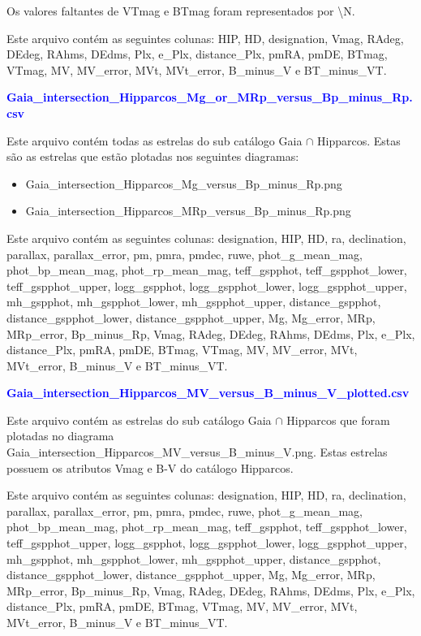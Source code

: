 \documentclass{article}
\begin{document}
	Os valores faltantes de VTmag e BTmag foram representados por \textbackslash N.
	
	Este arquivo contém as seguintes colunas:
	HIP, HD, designation, Vmag, RAdeg, DEdeg, RAhms, DEdms, Plx, e\_Plx, distance\_Plx, pmRA, pmDE, BTmag, VTmag, MV, MV\_error, MVt, MVt\_error, B\_minus\_V e BT\_minus\_VT.
	
	\vspace{10pt}

	\textcolor{blue}{\textbf{Gaia\_intersection\_Hipparcos\_Mg\_or\_MRp\_versus\_Bp\_minus\_Rp.csv}}
		
	\vspace{10pt}
	
	Este arquivo contém todas as estrelas do sub catálogo Gaia $\cap$ Hipparcos. 
	Estas são as estrelas que estão plotadas nos seguintes diagramas: 
	
	\begin{itemize}
		\item Gaia\_intersection\_Hipparcos\_Mg\_versus\_Bp\_minus\_Rp.png
		\item 	Gaia\_intersection\_Hipparcos\_MRp\_versus\_Bp\_minus\_Rp.png
	\end{itemize}
	
	Este arquivo contém as seguintes colunas:
	designation, HIP, HD, ra, declination, parallax, parallax\_error, pm, pmra, pmdec, ruwe, phot\_g\_mean\_mag, phot\_bp\_mean\_mag, phot\_rp\_mean\_mag, teff\_gspphot, teff\_gspphot\_lower, teff\_gspphot\_upper, logg\_gspphot, logg\_gspphot\_lower, logg\_gspphot\_upper, mh\_gspphot, mh\_gspphot\_lower, mh\_gspphot\_upper, distance\_gspphot, distance\_gspphot\_lower, distance\_gspphot\_upper, Mg, Mg\_error, MRp, MRp\_error, Bp\_minus\_Rp, Vmag, RAdeg, DEdeg, RAhms, DEdms, Plx, e\_Plx, distance\_Plx, pmRA, pmDE, BTmag, VTmag, MV, MV\_error, MVt, MVt\_error, B\_minus\_V e BT\_minus\_VT.
	
	\newpage
	
	\textcolor{blue}{\textbf{Gaia\_intersection\_Hipparcos\_MV\_versus\_B\_minus\_V\_plotted.csv}}
	
	\vspace{10pt}
	
	Este arquivo contém as estrelas do sub catálogo Gaia $\cap$ Hipparcos que foram plotadas no diagrama Gaia\_intersection\_Hipparcos\_MV\_versus\_B\_minus\_V.png.
	Estas estrelas possuem os atributos Vmag e B-V do catálogo Hipparcos.
	
	Este arquivo contém as seguintes colunas:
	designation, HIP, HD, ra, declination, parallax, parallax\_error, pm, pmra, pmdec, ruwe, phot\_g\_mean\_mag, phot\_bp\_mean\_mag, phot\_rp\_mean\_mag, teff\_gspphot, teff\_gspphot\_lower, teff\_gspphot\_upper, logg\_gspphot, logg\_gspphot\_lower, logg\_gspphot\_upper, mh\_gspphot, mh\_gspphot\_lower, mh\_gspphot\_upper, distance\_gspphot, distance\_gspphot\_lower, distance\_gspphot\_upper, Mg, Mg\_error, MRp, MRp\_error, Bp\_minus\_Rp, Vmag, RAdeg, DEdeg, RAhms, DEdms, Plx, e\_Plx, distance\_Plx, pmRA, pmDE, BTmag, VTmag, MV, MV\_error, MVt, MVt\_error, B\_minus\_V e BT\_minus\_VT.
	
\end{document}
